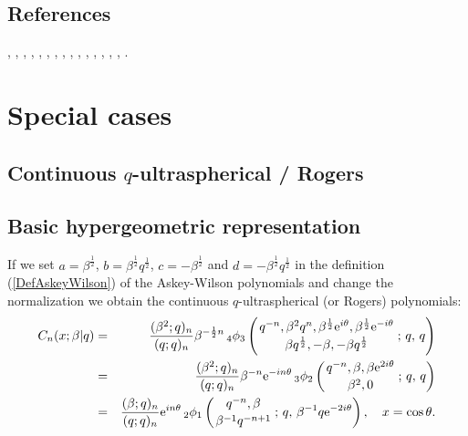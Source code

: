 \documentclass[envcountchap,graybox]{svmono}
\newcommand{\qhyp}[5]{\mbox{}_{#1}{\phi}_{#2}
\left(\genfrac{}{}{0pt}{}{#3}{#4}\,;\,q,\,#5\right)}
\newcommand{\e}{\textrm{e}}
\newcommand{\qhyp}[5]{\,\mbox{}_{#1}\phi_{#2}\!\left(
  \genfrac{}{}{0pt}{}{#3}{#4};#5\right)}
\begin{document}
\subsection*{References}
\cite{AskeyWilson85}, \cite{Floreanini+96}, \cite{GasperRahman86},
\cite{GasperRahman90}, \cite{IsmailMassonSuslov}, \cite{IsmailRahman91},
\cite{IsmailRahmanZhang}, \cite{Koorn2007}, \cite{NassrallahRahman}, \cite{Nikiforov+},
\cite{Rahman81IV}, \cite{Rahman85}, \cite{Rahman86I}, \cite{Rahman88},
\cite{Spiridonov97}, \cite{Szwarc}.


\section*{Special cases}

\subsection{Continuous $q$-ultraspherical / Rogers}
\par

\subsection*{Basic hypergeometric representation} If we set $a=\beta^{\frac{1}{2}}$, $b=\beta^{\frac{1}{2}}q^{\frac{1}{2}}$,
$c=-\beta^{\frac{1}{2}}$ and $d=-\beta^{\frac{1}{2}}q^{\frac{1}{2}}$ in the definition
(\ref{DefAskeyWilson}) of the Askey-Wilson polynomials and change the
normalization we obtain the continuous $q$-ultraspherical (or Rogers) polynomials:
\begin{eqnarray}
\label{DefContqUltra}
C_n(x;\beta|q)&=&\frac{(\beta^2;q)_n}{(q;q)_n}\beta^{-\frac{1}{2}n}\,\qhyp{4}{3}{q^{-n},\beta^2q^n,
\beta^{\frac{1}{2}}\e^{i\theta},\beta^{\frac{1}{2}}\e^{-i\theta}}{\beta q^{\frac{1}{2}},
-\beta,-\beta q^{\frac{1}{2}}}{q}\\
&=&\frac{(\beta^2;q)_n}{(q;q)_n}\beta^{-n}\e^{-in\theta}\,\qhyp{3}{2}{q^{-n},\beta,\beta\e^{2i\theta}}
{\beta^2,0}{q}\nonumber\\
&=&\frac{(\beta;q)_n}{(q;q)_n}\e^{in\theta}\,\qhyp{2}{1}{q^{-n},\beta}{\beta^{-1}q^{-n+1}}{\beta^{-1}q\e^{-2i\theta}},
\quad x=\cos\theta.\nonumber
\end{eqnarray}
\end{document}
